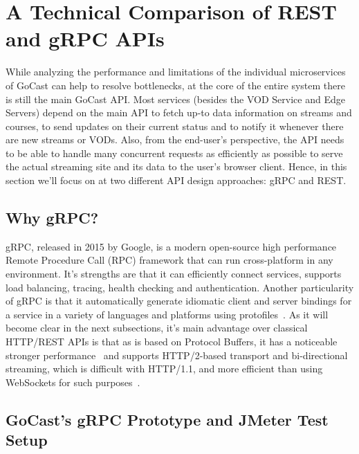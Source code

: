 
\section{A Technical Comparison of REST and gRPC APIs}

While analyzing the performance and limitations of the individual microservices of GoCast can help to resolve bottlenecks, at the core of the entire system there is still the main GoCast \ac{API}.
Most services (besides the VOD Service and Edge Servers) depend on the main \ac{API} to fetch up-to data information on streams and courses, to send updates on their current status and to notify it whenever there are new streams or \ac{VOD}s. Also, from the end-user's perspective, the API needs to be able to handle many concurrent requests as efficiently as possible to serve the actual streaming site and its data to the user's browser client.
Hence, in this section we'll focus on at two different \ac{API} design approaches: gRPC and REST.

\subsection{Why gRPC?}

gRPC, released in 2015 by Google, is a modern open-source high performance Remote Procedure Call (RPC) framework that can run cross-platform in any environment. It's strengths are that it can efficiently connect services, supports load balancing, tracing, health checking and authentication.
Another particularity of gRPC is that it automatically generate idiomatic client and server bindings for a service in a variety of languages and platforms using protofiles~\parencite{grpc_vs_rest}.
As it will become clear in the next subsections, it's main advantage over classical HTTP/REST \ac{API}s is that as is based on Protocol Buffers, it has a noticeable stronger performance~\parencite{grpc_vs_rest_2} and supports HTTP/2-based transport and bi-directional streaming, which is difficult with HTTP/1.1, and more efficient than using WebSockets for such purposes~\parencite{grpc_dev}.

\subsection{GoCast's gRPC Prototype and JMeter Test Setup}

